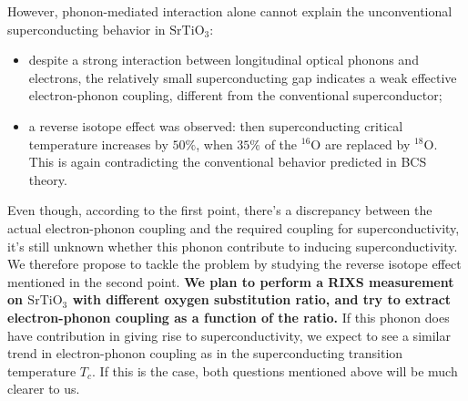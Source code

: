 \documentclass[11pt]{article}
\begin{document}
However, phonon-mediated interaction alone cannot explain the unconventional superconducting behavior in $\mathrm{SrTiO_{3}}$:
\begin{itemize}
  \item despite a strong interaction between longitudinal optical phonons and electrons, the relatively small superconducting gap indicates a weak effective electron-phonon coupling, different from the conventional superconductor; 
  \item a reverse isotope effect was observed: then superconducting critical temperature increases by $50\%$, when $35\%$ of the ${}^{16}\mathrm{O}$ are replaced by ${}^{18}\mathrm{O}$\cite{stucky_isotope_2016}. This is again contradicting the conventional behavior predicted in BCS theory.
\end{itemize}
Even though, according to the first point, there's a discrepancy between the actual electron-phonon coupling and the required coupling for superconductivity, it's still unknown whether this phonon contribute to inducing superconductivity. We therefore propose to tackle the problem by studying the reverse isotope effect mentioned in the second point. \textbf{We plan to perform a RIXS measurement on $\mathrm{SrTiO_{3}}$ with different oxygen substitution ratio, and try to extract electron-phonon coupling as a function of the ratio.}  If this phonon does have  contribution in giving rise to superconductivity, we expect to see a similar trend in electron-phonon coupling as in the superconducting transition temperature $T_{c}$. If this is the case, both questions mentioned above will be much clearer to us. 
\end{document}

